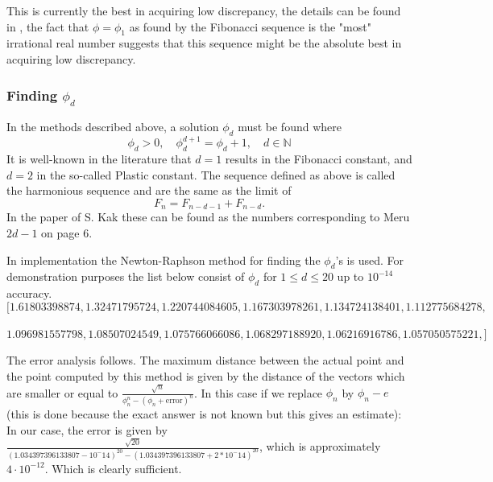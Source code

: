This is currently the best in acquiring low discrepancy, the details can be found in \cite{rand_sequences}, the fact that $\phi = \phi_1$ as found by the Fibonacci sequence is the "most" irrational real number suggests that this sequence might be the absolute best in acquiring low discrepancy.

\subsubsection{Finding $\phi_d$}
In the methods described above, a solution $\phi_d$ must be found where
\begin{equation}
    \phi_d > 0, \quad \phi_d^{d+1} = \phi_d + 1, \quad d \in \mathbb{N}
\end{equation}
It is well-known in the literature that $d = 1$ results in the Fibonacci constant, and $d = 2$ in the so-called Plastic constant. The sequence defined as above is called the harmonious sequence and are the same as the limit of
\begin{equation}
    F_n = F_{n-d-1} + F_{n-d}.
\end{equation} In the paper of S. Kak \cite{Meru} these can be found as the numbers corresponding to Meru $2d -1$ on page 6.

In implementation the Newton-Raphson method for finding the $\phi_d$’s is used. For demonstration purposes the list below consist of $\phi_d$ for $1 \leq d \leq 20$ up to $10^{-14}$ accuracy.\\
$$ [1.61803398874, 1.32471795724, 1.220744084605,  1.167303978261, 1.134724138401, 1.112775684278, $$\ $$1.096981557798, 1.08507024549, 1.075766066086, 1.068297188920, 1.06216916786, 1.057050575221, ]$$

The error analysis follows. The maximum distance between the actual point and the point computed by this method is given by the distance of the vectors which are smaller or equal to $\frac{\sqrt{n}}{\phi_n^n - (\phi_n + \text{error})^n}$. In this case if we replace $\phi_n$ by $\phi_n - e$ (this is done because the exact answer is not known but this gives an estimate): In our case, the error is given by $\frac{\sqrt{20}}{(1.034397396133807 - 10^-14)^{20} - (1.034397396133807 + 2*10^-14)^{20}}$, which is approximately $4 \cdot10^{-12}$. Which is clearly sufficient.

